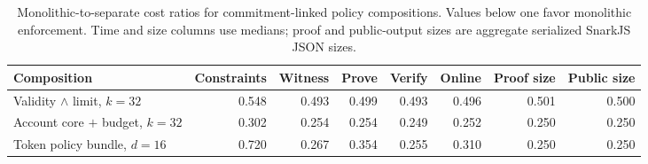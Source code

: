\begin{table}[t]
\centering
\scriptsize
\setlength{\tabcolsep}{4.0pt}
\renewcommand{\arraystretch}{1.05}
\caption{Monolithic-to-separate cost ratios for commitment-linked policy
compositions. Values below one favor monolithic enforcement. Time and size
columns use medians; proof and public-output sizes are aggregate serialized
SnarkJS JSON sizes.}
\label{tab:composition-ratios}
\begin{tabular}{@{}lrrrrrrr@{}}
\toprule
\textbf{Composition} &
\textbf{Constraints} &
\textbf{Witness} &
\textbf{Prove} &
\textbf{Verify} &
\textbf{Online} &
\textbf{Proof size} &
\textbf{Public size} \\
\midrule
Validity $\wedge$ limit, $k=32$ & 0.548 & 0.493 & 0.499 & 0.493 & 0.496 & 0.501 & 0.500 \\
Account core $+$ budget, $k=32$ & 0.302 & 0.254 & 0.254 & 0.249 & 0.252 & 0.250 & 0.250 \\
Token policy bundle, $d=16$ & 0.720 & 0.267 & 0.354 & 0.255 & 0.310 & 0.250 & 0.250 \\
\bottomrule
\end{tabular}
\end{table}
